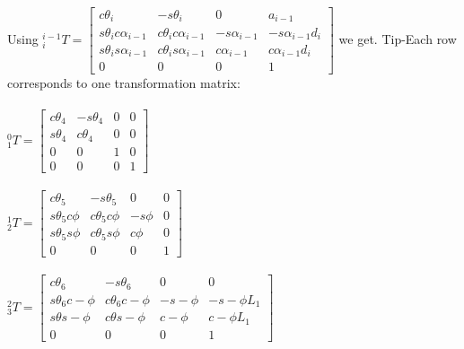 \documentclass{article}
\begin{document}
Using
${}^{i-1}_{i}T=\begin{bmatrix}
c\theta_i & -s\theta_i & 0 & a_{i-1}\\
s\theta_ic\alpha_{i-1} & c\theta_ic\alpha_{i-1} & -s\alpha_{i-1} & -s\alpha_{i-1}d_{i}\\
s\theta_is\alpha_{i-1} & c\theta_is\alpha_{i-1} & c\alpha_{i-1} & c\alpha_{i-1}d_{i}\\
                0 & 0 & 0 & 1
\end{bmatrix}$ we get. Tip-Each row corresponds to one transformation matrix:\\\\
${}^{0}_{1}T=
\begin{bmatrix}
c\theta_4 & -s\theta_4 & 0 & 0\\
s\theta_4 & c\theta_4 & 0 & 0\\
0 & 0 & 1 & 0\\
0 & 0 & 0 & 1
\end{bmatrix}$\\\\
${}^{1}_{2}T=
\begin{bmatrix}
c\theta_5 & -s\theta_5 & 0 & 0\\
s\theta_5c\phi & c\theta_5c\phi & -s\phi & 0\\
s\theta_5s\phi & c\theta_5s\phi & c\phi & 0\\
0 & 0 & 0 & 1
\end{bmatrix}$\\\\
${}^{2}_{3}T=
\begin{bmatrix}
c\theta_6 & -s\theta_6 & 0 & 0\\
s\theta_6c-\phi & c\theta_6c-\phi & -s-\phi & -s-\phi L_1\\
s\theta s-\phi & c\theta s-\phi & c-\phi & c-\phi L_1\\
0 & 0 & 0 & 1
\end{bmatrix}$
\newpage
\end{document}
